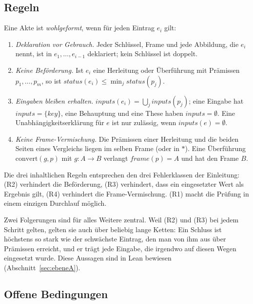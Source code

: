 \subsection{Regeln}

\begin{definition}[Wohlgeformtheit]\label{def:regeln}
Eine Akte ist \emph{wohlgeformt}, wenn für jeden Eintrag \(e_i\) gilt:
\begin{enumerate}[nosep,label=(R\arabic*)]
\item \emph{Deklaration vor Gebrauch.} Jeder Schlüssel, Frame und jede Abbildung, die \(e_i\) nennt, ist in \(e_1,\dots,e_{i-1}\) deklariert;
kein Schlüssel ist doppelt.
\item \emph{Keine Beförderung.} Ist \(e_i\) eine Herleitung oder Überführung mit Prämissen \(p_1,\dots,p_m\), so ist
\(\mathit{status}(e_i)\le\min_j\mathit{status}(p_j)\).
\item \emph{Eingaben bleiben erhalten.} \(\mathit{inputs}(e_i)=\bigcup_j\mathit{inputs}(p_j)\); eine Eingabe hat \(\mathit{inputs}=\{\mathit{key}\}\),
eine Behauptung und eine These haben \(\mathit{inputs}=\emptyset\). Eine Unabhängigkeitserklärung für \(e\) ist nur zulässig, wenn
\(\mathit{inputs}(e)=\emptyset\).
\item \emph{Keine Frame-Vermischung.} Die Prämissen einer Herleitung und die beiden Seiten eines Vergleichs liegen im selben Frame
(oder in \(*\)). Eine Überführung \(\mathrm{convert}(g,p)\) mit \(g\colon A\to B\) verlangt \(\mathit{frame}(p)=A\) und hat den Frame \(B\).
\end{enumerate}
\end{definition}

Die drei inhaltlichen Regeln entsprechen den drei Fehlerklassen der Einleitung: (R2) verhindert die Beförderung, (R3) verhindert, dass ein
eingesetzter Wert als Ergebnis gilt, (R4) verhindert die Frame-Vermischung. (R1) macht die Prüfung in einem einzigen Durchlauf
möglich.

Zwei Folgerungen sind für alles Weitere zentral. Weil (R2) und (R3) bei jedem Schritt gelten, gelten sie auch über beliebig lange Ketten:
Ein Schluss ist höchstens so stark wie der schwächste Eintrag, den man von ihm aus über Prämissen erreicht, und er trägt jede Eingabe,
die irgendwo auf diesen Wegen eingesetzt wurde. Diese Aussagen sind in Lean bewiesen (Abschnitt~\ref{sec:ebeneA}).

\subsection{Offene Bedingungen}\label{sec:offen}

